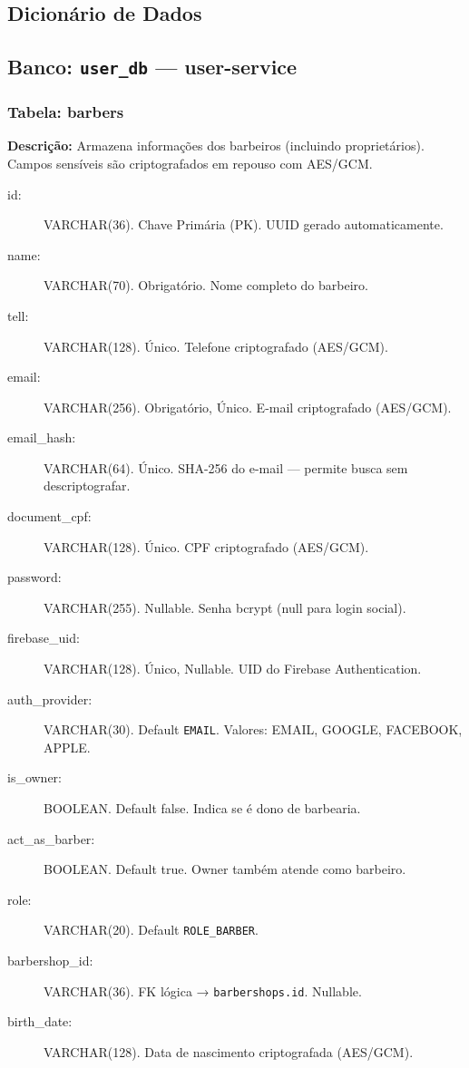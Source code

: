\documentclass[
    12pt, 
    a4paper, 
    oneside, 
    chapter=TITLE, 
    section=TITLE
]{abntex2}
\begin{document}
\begin{apendicesenv}

\chapter{Dicionário de Dados}

\section*{Banco: \texttt{user\_db} — user-service}

\subsection*{Tabela: barbers}
\textbf{Descrição:} Armazena informações dos barbeiros (incluindo proprietários). Campos sensíveis são criptografados em repouso com AES/GCM.
\begin{description}
    \item[id:] VARCHAR(36). Chave Primária (PK). UUID gerado automaticamente.
    \item[name:] VARCHAR(70). Obrigatório. Nome completo do barbeiro.
    \item[tell:] VARCHAR(128). Único. Telefone criptografado (AES/GCM).
    \item[email:] VARCHAR(256). Obrigatório, Único. E-mail criptografado (AES/GCM).
    \item[email\_hash:] VARCHAR(64). Único. SHA-256 do e-mail — permite busca sem descriptografar.
    \item[document\_cpf:] VARCHAR(128). Único. CPF criptografado (AES/GCM).
    \item[password:] VARCHAR(255). Nullable. Senha bcrypt (null para login social).
    \item[firebase\_uid:] VARCHAR(128). Único, Nullable. UID do Firebase Authentication.
    \item[auth\_provider:] VARCHAR(30). Default \texttt{EMAIL}. Valores: EMAIL, GOOGLE, FACEBOOK, APPLE.
    \item[is\_owner:] BOOLEAN. Default false. Indica se é dono de barbearia.
    \item[act\_as\_barber:] BOOLEAN. Default true. Owner também atende como barbeiro.
    \item[role:] VARCHAR(20). Default \texttt{ROLE\_BARBER}.
    \item[barbershop\_id:] VARCHAR(36). FK lógica → \texttt{barbershops.id}. Nullable.
    \item[birth\_date:] VARCHAR(128). Data de nascimento criptografada (AES/GCM).

\end{description}
\end{apendicesenv}
\end{document}
